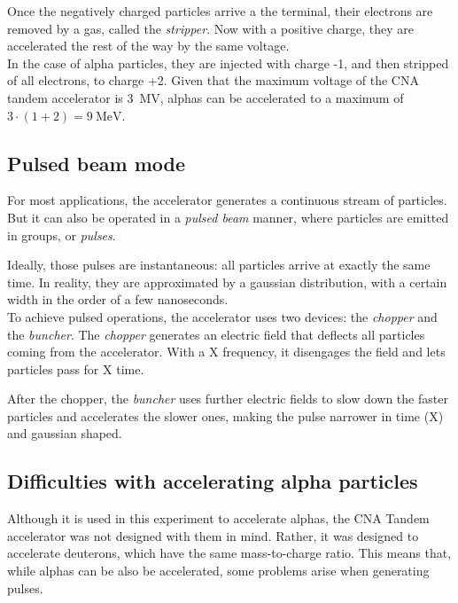 \documentclass[a4paper,12pt]{report}
\begin{document}
Once the negatively charged particles arrive a the terminal, their electrons are removed by a gas, called the \textit{stripper}.
Now with a positive charge, they are accelerated the rest of the way by the same voltage.
\\

In the case of alpha particles, they are injected with charge -1, and then stripped of all electrons, to charge +2.
Given that the maximum voltage of the CNA tandem accelerator is \qty{3}{\mega\volt}, alphas can be accelerated to a maximum of $3\cdot\left(1+2\right) = \qty{9}{\mega\eV}$.	%
\\

\subsection{Pulsed beam mode}
For most applications, the accelerator generates a continuous stream of particles.
But it can also be operated in a \textit{pulsed beam} manner, where particles are emitted in groups, or \textit{pulses}.

Ideally, those pulses are instantaneous: all particles arrive at exactly the same time.
In reality, they are approximated by a gaussian distribution, with a certain width in the order of a few nanoseconds.	%
\\

To achieve pulsed operations, the accelerator uses two devices: the \textit{chopper} and the \textit{buncher}.
The \textit{chopper} generates an electric field that deflects all particles coming from the accelerator.
With a X frequency, it disengages the field and lets particles pass for X time.	%

After the chopper, the \textit{buncher} uses further electric fields to slow down the faster particles and accelerates the slower ones, making the pulse narrower in time (X) and gaussian shaped.	%
\\

\subsection{Difficulties with accelerating alpha particles}	%
Although it is used in this experiment to accelerate alphas, the CNA Tandem accelerator was not designed with them in mind.
Rather, it was designed to accelerate deuterons, which have the same mass-to-charge ratio.
This means that, while alphas can be also be accelerated, some problems arise when generating pulses.
\end{document}
